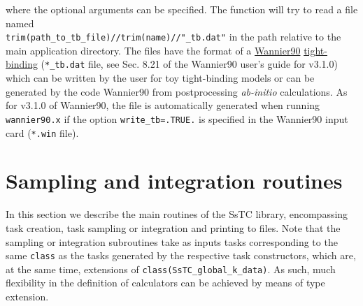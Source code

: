 \documentclass[10pt,a4paper]{article}
\begin{document}
where the optional arguments can be specified. The function will try to read a file named \\ \verb|trim(path_to_tb_file)//trim(name)//"_tb.dat"| in the path relative to the main application directory. The files have the format of a \href{https://wannier.org/}{Wannier90} \cite{pizziWannier90CommunityCode2020} \href{https://raw.githubusercontent.com/wannier-developers/wannier90/v3.1.0/doc/compiled_docs/user_guide.pdf}{tight-binding} (\verb|*_tb.dat| file, see Sec. 8.21 of the Wannier90 user's guide for v3.1.0) which can be written by the user for toy tight-binding models or can be generated by the code Wannier90 from postprocessing \textit{ab-initio} calculations. As for v3.1.0 of Wannier90, the file is automatically generated when running \verb|wannier90.x| if the option \verb|write_tb=.TRUE.| is specified in the Wannier90 input card (\verb|*.win| file).
\section{Sampling and integration routines}\label{sec: sampling_integration}
In this section we describe the main routines of the SsTC library, encompassing task creation, task sampling or integration and printing to files. Note that the sampling or integration subroutines take as inputs tasks corresponding to the same \verb|class| as the tasks generated by the respective task constructors, which are, at the same time, extensions of \verb|class(SsTC_global_k_data)|. As such, much flexibility in the definition of calculators can be achieved by means of type extension.
\end{document}
